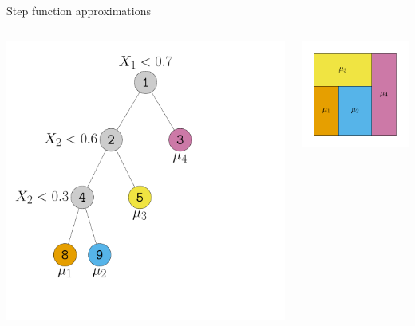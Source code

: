 \documentclass[aspectratio=199]{beamer}
\begin{document}
\begin{frame}{Step function approximations}
\begin{columns}
\begin{column}{0.3\textwidth}
\centering
\includegraphics[width = \textwidth]{figures/old_decision_rule}
\end{column}
\begin{column}{0.3\textwidth}
\centering
\includegraphics[width = \textwidth]{figures/old_partition}
\end{column}


\end{columns}
\end{frame}
\end{document}
